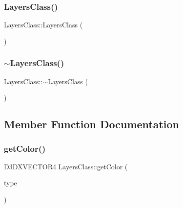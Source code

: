 \mbox{\label{class_layers_class_a7fad3b0ac037e648a73a7483fd2f6905}} 
\subsubsection{\texorpdfstring{Layers\+Class()}{LayersClass()}\hspace{0.1cm}{\footnotesize\ttfamily [2/2]}}
{\footnotesize\ttfamily Layers\+Class\+::\+Layers\+Class (\begin{DoxyParamCaption}\item[{const \hyperlink{class_layers_class}{Layers\+Class} \&}]{ }\end{DoxyParamCaption})}

\mbox{\label{class_layers_class_a8420a9854d542d9a34f23f14635b802f}} 
\subsubsection{\texorpdfstring{$\sim$\+Layers\+Class()}{~LayersClass()}}
{\footnotesize\ttfamily Layers\+Class\+::$\sim$\+Layers\+Class (\begin{DoxyParamCaption}{ }\end{DoxyParamCaption})}



\subsection{Member Function Documentation}
\mbox{\label{class_layers_class_ad116b43781c2fd810b483be9f68b43ee}} 
\subsubsection{\texorpdfstring{get\+Color()}{getColor()}}
{\footnotesize\ttfamily D3\+D\+X\+V\+E\+C\+T\+O\+R4 Layers\+Class\+::get\+Color (\begin{DoxyParamCaption}\item[{\hyperlink{class_global_manager_class_a794b4a5298c61f8d25d9da44b7826857}{Global\+Manager\+Class\+::region\+Type}}]{type }\end{DoxyParamCaption})}



